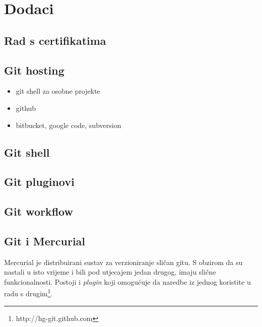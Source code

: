 \chapter*{Dodaci}

\section*{Rad s certifikatima}

\TODO

\section*{Git hosting}

\TODO

\begin{itemize}
   \item git shell za osobne projekte
   \item github
   \item bitbucket, google code, subversion
\end{itemize}

\section*{Git shell}

\TODO

\section*{Git pluginovi}

\TODO

\section*{Git workflow}

\TODO

\section*{Git i Mercurial}

Mercurial je distribuirani sustav za verzioniranje sličan gitu.
S obzirom da su nastali u isto vrijeme i bili pod utjecajem jedan drugog, imaju slične funkcionalnosti.
Postoji i \emph{plugin} koji omogućuje da naredbe iz jednog koristite u radu s drugim\footnote{http://hg-git.github.com}.

